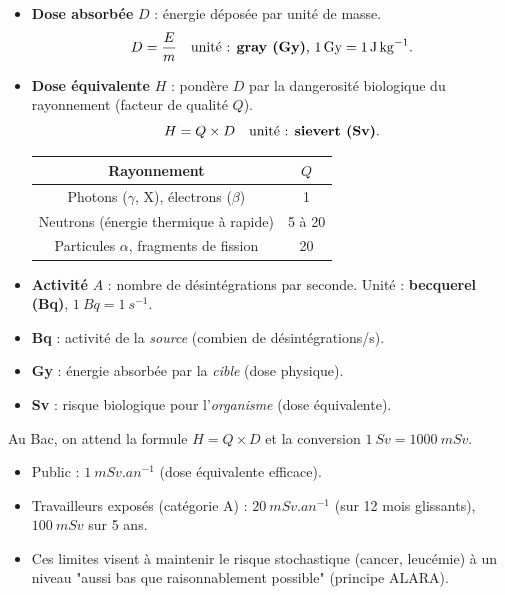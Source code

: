 \documentclass[11pt]{article}
\begin{document}
\begin{propriete}
\begin{itemize}
\item \textbf{Dose absorbée} $D$ : énergie déposée par unité de masse.
  \[ D = \frac{E}{m} \quad \text{unité : \textbf{gray (Gy)}, } \SI{1}{Gy} = \SI{1}{J.kg^{-1}}. \]
\item \textbf{Dose équivalente} $H$ : pondère $D$ par la dangerosité biologique du rayonnement (facteur de qualité $Q$).
  \[ H = Q \times D \quad \text{unité : \textbf{sievert (Sv)}}. \]
  \begin{center}
  \begin{tabular}{|c|c|}\hline
  Rayonnement & $Q$ \\ \hline
  Photons ($\gamma$, X), électrons ($\beta$) & 1 \\ \hline
  Neutrons (énergie thermique à rapide) & 5 à 20 \\ \hline
  Particules $\alpha$, fragments de fission & 20 \\ \hline
  \end{tabular}
  \end{center}
\item \textbf{Activité} $A$ : nombre de désintégrations par seconde. Unité : \textbf{becquerel (Bq)}, $\SI{1}{Bq} = \SI{1}{s^{-1}}$.
\end{itemize}
\end{propriete}

\begin{attention}
\begin{itemize}
\item \textbf{Bq} : activité de la \emph{source} (combien de désintégrations/s).
\item \textbf{Gy} : énergie absorbée par la \emph{cible} (dose physique).
\item \textbf{Sv} : risque biologique pour l'\emph{organisme} (dose équivalente).
\end{itemize}
Au Bac, on attend la formule $H = Q \times D$ et la conversion $\SI{1}{Sv} = \SI{1000}{mSv}$.
\end{attention}

\begin{savaistu}
\begin{itemize}
\item Public : $\SI{1}{mSv.an^{-1}}$ (dose équivalente efficace).
\item Travailleurs exposés (catégorie A) : $\SI{20}{mSv.an^{-1}}$ (sur 12 mois glissants), $\SI{100}{mSv}$ sur 5 ans.
\item Ces limites visent à maintenir le risque stochastique (cancer, leucémie) à un niveau "aussi bas que raisonnablement possible" (principe ALARA).
\end{itemize}
\end{savaistu}
\end{document}
